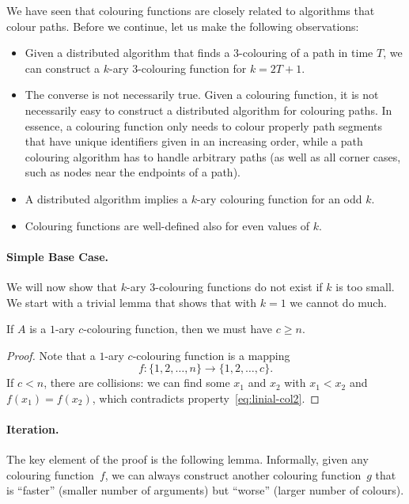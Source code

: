 We have seen that colouring functions are closely related to algorithms that colour paths. Before we continue, let us make the following observations:
\begin{itemize}
    \item Given a distributed algorithm that finds a $3$-colouring of a path in time $T$, we can construct a $k$-ary $3$-colouring function for $k = 2T+1$.
    \item The converse is not necessarily true. Given a colouring function, it is not necessarily easy to construct a distributed algorithm for colouring paths. In essence, a colouring function only needs to colour properly path segments that have unique identifiers given in an increasing order, while a path colouring algorithm has to handle arbitrary paths (as well as all corner cases, such as nodes near the endpoints of a path).
    \item A distributed algorithm implies a $k$-ary colouring function for an odd $k$.
    \item Colouring functions are well-defined also for even values of $k$.
\end{itemize}


\paragraph{Simple Base Case.}

We will now show that $k$-ary $3$-colouring functions do not exist if $k$ is too small. We start with a trivial lemma that shows that with $k = 1$ we cannot do much.

\begin{lemma}\label{lem:linial-base}
    If $A$ is a $1$-ary $c$-colouring function, then we must have $c \ge n$.
\end{lemma}
\begin{proof}
    Note that a $1$-ary $c$-colouring function is a mapping
    \[
        f\colon \{1,2,\dotsc,n\} \to \{1,2,\dotsc,c\}.
    \]
    If $c < n$, there are collisions: we can find some $x_1$ and $x_2$ with $x_1 < x_2$ and $f(x_1) = f(x_2)$, which contradicts property~\eqref{eq:linial-col2}.
\end{proof}


\paragraph{Iteration.}

The key element of the proof is the following lemma. Informally, given any colouring function~$f$, we can always construct another colouring function~$g$ that is ``faster'' (smaller number of arguments) but ``worse'' (larger number of colours).

